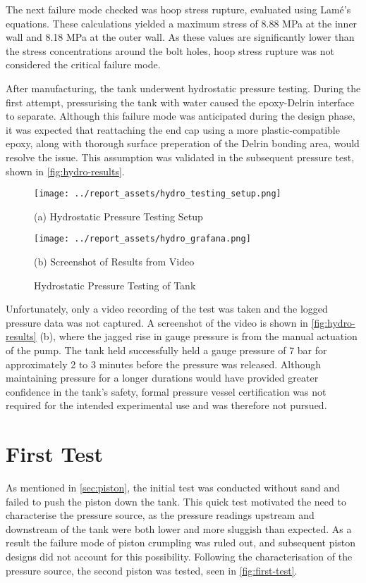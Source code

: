 The next failure mode checked was hoop stress rupture, evaluated using Lamé's equations. These calculations yielded a maximum stress of 8.88 MPa at the inner wall and 8.18 MPa at the outer wall. As these values are significantly lower than the stress concentrations around the bolt holes, hoop stress rupture was not considered the critical failure mode.

After manufacturing, the tank underwent hydrostatic pressure testing. During the first attempt, pressurising the tank with water caused the epoxy-Delrin interface to separate. Although this failure mode was anticipated during the design phase, it was expected that reattaching the end cap using a more plastic-compatible epoxy, along with thorough surface preperation of the Delrin bonding area, would resolve the issue. This assumption was validated in the subsequent pressure test, shown in \autoref{fig:hydro-results}.
\begin{figure}[htbp]
    \centering

    \begin{minipage}{0.45\textwidth}
        \centering
        \texttt{[image: ../report\_assets/hydro\_testing\_setup.png]}
        \caption*{(a) Hydrostatic Pressure Testing Setup}
    \end{minipage}    
    \hfill
    \begin{minipage}{0.45\textwidth}
        \centering
        \texttt{[image: ../report\_assets/hydro\_grafana.png]}
        \caption*{(b) Screenshot of Results from Video}
    \end{minipage}    
    \caption{Hydrostatic Pressure Testing of Tank}\label{fig:hydro-results}

\end{figure}  
Unfortunately, only a video recording of the test was taken and the logged pressure data was not captured. A screenshot of the video is shown in \autoref{fig:hydro-results} (b), where the jagged rise in gauge pressure is from the manual actuation of the pump. The tank held successfully held a gauge pressure of 7 bar for approximately 2 to 3 minutes before the pressure was released. Although maintaining pressure for a longer durations would have provided greater confidence in the tank's safety, formal pressure vessel certification was not required for the intended experimental use and was therefore not pursued.

\section{First Test}\label{sec:first-test}
As mentioned in \autoref{sec:piston}, the initial test was conducted without sand and failed to push the piston down the tank. This quick test motivated the need to characterise the pressure source, as the pressure readings upstream and downstream of the tank were both lower and more sluggish than expected. As a result the failure mode of piston crumpling was ruled out, and subsequent piston designs did not account for this possibility. Following the characterisation of the pressure source, the second piston was tested, seen in \autoref{fig:first-test}. 

